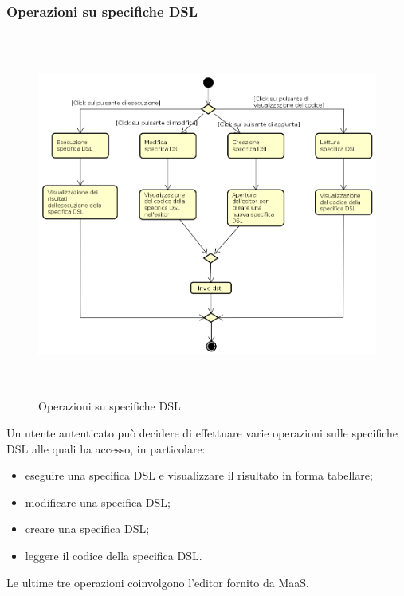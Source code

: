 \subsubsection{Operazioni su specifiche DSL}
\begin{figure}[H]
\begin{center}
\includegraphics[height=12cm]{res/sections/backend/activities/operazioniDSL.png}
\caption{Operazioni su specifiche DSL}
\end{center}
\end{figure}
Un utente autenticato può decidere di effettuare varie operazioni sulle specifiche DSL alle quali ha accesso, in particolare:
\begin{itemize}
\item eseguire una specifica DSL e visualizzare il risultato in forma tabellare;
\item modificare una specifica DSL;
\item creare una specifica DSL;
\item leggere il codice della specifica DSL.
\end{itemize}
Le ultime tre operazioni coinvolgono l'editor fornito da MaaS.
